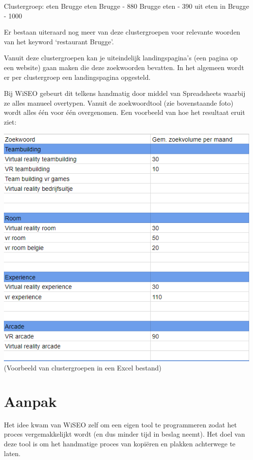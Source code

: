 Clustergroep: eten Brugge
eten Brugge - 880
Brugge eten - 390
uit eten in Brugge - 1000

Er bestaan uiteraard nog meer van deze clustergroepen voor relevante woorden van het keyword ‘restaurant Brugge’. 

Vanuit deze clustergroepen kan je uiteindelijk landingspagina’s (een pagina op een website) gaan maken die deze zoekwoorden bevatten. In het algemeen wordt er per clustergroep een landingspagina opgesteld.  

Bij WiSEO gebeurt dit telkens handmatig door middel van Spreadsheets waarbij ze alles manueel overtypen. Vanuit de zoekwoordtool (zie bovenstaande foto) wordt alles één voor één overgenomen. Een voorbeeld van hoe het resultaat eruit ziet: 

\includegraphics[width=\linewidth]{Bachelorproef/bachelor/img/Clustergroepenvoorbeeld.png}
(Voorbeeld van clustergroepen in een Excel bestand)

\section{Aanpak}
\label{ch: Aanpak}

Het idee kwam van WiSEO zelf om een eigen tool te programmeren zodat het proces vergemakkelijkt wordt (en dus minder tijd in beslag neemt). Het doel van deze tool is om het handmatige proces van kopiëren en plakken achterwege te laten. 

